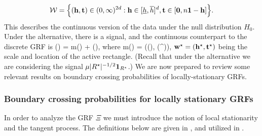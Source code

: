 \documentclass[twoside,11pt]{article}
\begin{document}
\[
\mathcal{W} = \Big\{ (\mathbf{h}, \mathbf{t}) \in (0,\infty)^{2d} : \mathbf{h} \in [\underline h,\overline h]^d, \mathbf{t} \in [{\bf 0}, n {\bf 1} - \mathbf{h}] \Big\}.
\]
This describes the continuous version of the data under the null distribution $H_0$.
Under the alternative, there is a signal, and the continuous counterpart to the discrete GRF is  
\beq\label{Upsilon}
\Upsilon(\wb) = m(\wb) + \Xi(\wb),
\eeq
where  
\beq \label{m}
m(\wb) = \mu \Cov(\Xi(\wb), \Xi(\wb^\star)),
\eeq
$\mathbf{w}^\star = (\mathbf{h}^\star, \mathbf{t}^\star)$ being the scale and location of the active rectangle.
(Recall that under the alternative we are considering the signal $\mu |R^\star|^{-1/2} {\bf 1}_{R^\star}$.)
We are now prepared to review some relevant results on boundary crossing probabilities of locally-stationary GRFs.

\subsubsection{Boundary crossing probabilities for locally stationary GRFs}

In order to analyze the GRF $\Xi$ we must introduce the notion of local stationarity and the tangent process.
The definitions below are given in \citep{chan2006maxima,qualls1973asymptotic}, and utilized in \citep{kabluchko2011extremes}.
\end{document}
